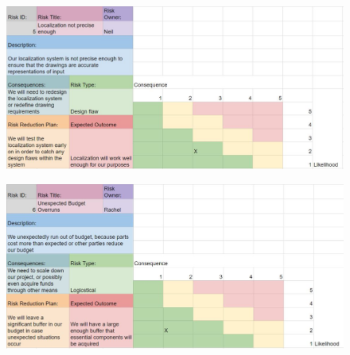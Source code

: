 \begin{figure}[h!]
\centering
\includegraphics[width=0.98\columnwidth]{risks/risk5.JPG}
\label{fig:risk5}
\end{figure}
\begin{figure}[h!]
\centering
\includegraphics[width=0.98\columnwidth]{risks/risk6.JPG}
\label{fig:risk6}
\end{figure}